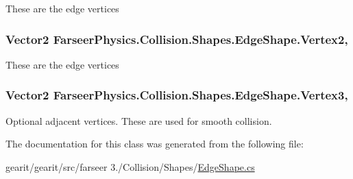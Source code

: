 These are the edge vertices 

\hypertarget{class_farseer_physics_1_1_collision_1_1_shapes_1_1_edge_shape_af27caa18e3cd7c2da1663f81950e8f2c}{
\subsubsection[{Vertex2}]{\setlength{\rightskip}{0pt plus 5cm}Vector2 Farseer\+Physics.\+Collision.\+Shapes.\+Edge\+Shape.\+Vertex2\hspace{0.3cm}{\ttfamily [get]}, {\ttfamily [set]}}}\label{class_farseer_physics_1_1_collision_1_1_shapes_1_1_edge_shape_af27caa18e3cd7c2da1663f81950e8f2c}


These are the edge vertices 

\hypertarget{class_farseer_physics_1_1_collision_1_1_shapes_1_1_edge_shape_a636e6dc7a6a13eefadd4e20056a19f79}{
\subsubsection[{Vertex3}]{\setlength{\rightskip}{0pt plus 5cm}Vector2 Farseer\+Physics.\+Collision.\+Shapes.\+Edge\+Shape.\+Vertex3\hspace{0.3cm}{\ttfamily [get]}, {\ttfamily [set]}}}\label{class_farseer_physics_1_1_collision_1_1_shapes_1_1_edge_shape_a636e6dc7a6a13eefadd4e20056a19f79}


Optional adjacent vertices. These are used for smooth collision. 



The documentation for this class was generated from the following file\+:\begin{DoxyCompactItemize}
\item 
gearit/gearit/src/farseer 3./\+Collision/\+Shapes/\hyperlink{_edge_shape_8cs}{Edge\+Shape.\+cs}\end{DoxyCompactItemize}
